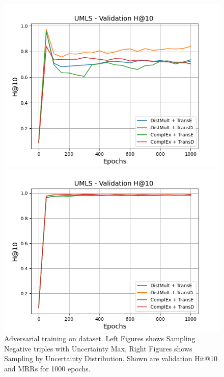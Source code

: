 \begin{figure}
\begin{minipage}{.5\textwidth}
    \end{minipage}
    \begin{minipage}{.5\textwidth}
      \centering
      \includegraphics[width=0.9\linewidth]{figures/results/gan_train/not_pretrained/uncertainty/max/entropy/umls/uncertainty_umls_hit10.png}
    \end{minipage}%
    \begin{minipage}{.5\textwidth}
      \centering
      \includegraphics[width=0.9\linewidth]{figures/results/gan_train/not_pretrained/uncertainty/max_distribution/entropy/umls/uncertainty_umls_hit10.png}
    \end{minipage}%
    \caption{Adversarial training on \umls dataset. 
    Left Figures shows Sampling Negative triples with Uncertainty Max, Right Figures shows Sampling by Uncertainty Distribution.
    Shown are validation Hit@10 and MRRs for 1000 epochs.}
    \label{fig:advtrain_umls_usmax_ussoftmax}
\end{figure}
